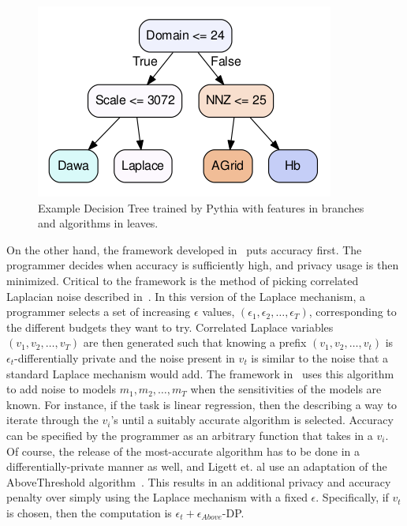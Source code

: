 \documentclass[11pt]{report}
\begin{document}
\begin{figure}
\begin{center}
\includegraphics[scale=0.5]{PythiaDTree}
\end{center}
\caption{Example Decision Tree trained by Pythia with features in branches and algorithms in leaves.}\label{fig:pythia}
\end{figure}
On the other hand, the framework developed in~\cite{Ligett:2017} puts accuracy first. The programmer decides when accuracy is sufficiently high, and privacy usage is then minimized. Critical to the framework is the method of picking correlated Laplacian noise described in~\cite{Koufogiannis:2015}. In this version of the Laplace mechanism, a programmer selects a set of increasing $\epsilon$ values, $(\epsilon_1, \epsilon_2, \ldots, \epsilon_T)$, corresponding to the different budgets they want to try. Correlated Laplace variables $(v_1, v_2, \ldots, v_T)$ are then generated such that knowing a prefix $(v_1, v_2, \ldots, v_t)$ is $\epsilon_t$-differentially private and the noise present in $v_t$ is similar to the noise that a standard Laplace mechanism would add. The framework in~\cite{Ligett:2017} uses this algorithm to add noise to models $m_1, m_2, \ldots, m_T$ when the sensitivities of the models are known. For instance, if the task is linear regression, then the describing a way to iterate through the $v_i$'s until a suitably accurate algorithm is selected. Accuracy can be specified by the programmer as an arbitrary function that takes in a $v_i$. Of course, the release of the most-accurate algorithm has to be done in a differentially-private manner as well, and Ligett et. al use an adaptation of the AboveThreshold algorithm~\cite{Dwork:2006}. This results in an additional privacy and accuracy penalty over simply using the Laplace mechanism with a fixed $\epsilon$. Specifically, if $v_t$ is chosen, then the computation is $\epsilon_t+\epsilon_{Above}$-DP.
\end{document}
